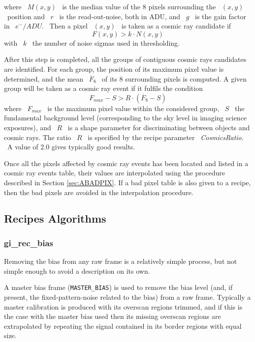 where \ $M(x,y)$ \ is the median value of the 8 pixels 
surrounding the \ $(x,y)$ \ position 
and \ $r$ \ is the read-out-noise, both in ADU, 
and \ $g$ \ is the gain
factor in \ $e^-/ADU$. \ Then a pixel \ $(x,y)$ \ is taken as a cosmic 
ray candidate if
$$
             F(x,y) > k \cdot N(x,y)
$$
with \ $k$ \ the number of noise sigmas used in thresholding.

After this step is completed, all the groups of contiguous cosmic
rays candidates are identified. For each group, the position of 
its maximum pixel value is determined, and the mean 
\ $\overline{F}_8$ \ of its 
8 surrounding pixels is computed. A given group will be taken as a
cosmic ray event if it fulfils the condition
$$
             F_{max} - S > R \cdot (\overline{F}_8 - S)
$$
where \ $F_{max}$ \ is the maximum pixel value within the considered group,
\ $S$ \ the fundamental background level (corresponding to the sky level
in imaging science exposures), and \ $R$ \ is a shape parameter for 
discriminating between objects and cosmic rays. The ratio \ $R$ \ is 
specified by the recipe parameter \ {\it CosmicsRatio}. 
\ A value of 2.0 gives typically good results.

Once all the pixels affected by cosmic ray events has been located
and listed in a cosmic ray events table, their values are interpolated 
using the procedure described in Section \ref{sec:ABADPIX}. If a bad pixel 
table is also given to a recipe, then the bad pixels are avoided in the 
interpolation procedure.

\subsection{Recipes Algorithms} 

\subsubsection{gi\_rec\_bias}
\label{sec:ABIAS}

Removing the bias from any raw frame is a relatively simple
process, but not simple enough to avoid a description on its own.

A master bias frame ({\tt MASTER\_BIAS}) is used to remove
the bias level (and, if present, the fixed-pattern-noise related
to the bias) from a raw frame. Typically a master calibration
is produced with its overscan regions trimmed, and if this is the
case with the master bias used then its missing overscan regions
are extrapolated by repeating the signal contained in its border
regions with equal size.

